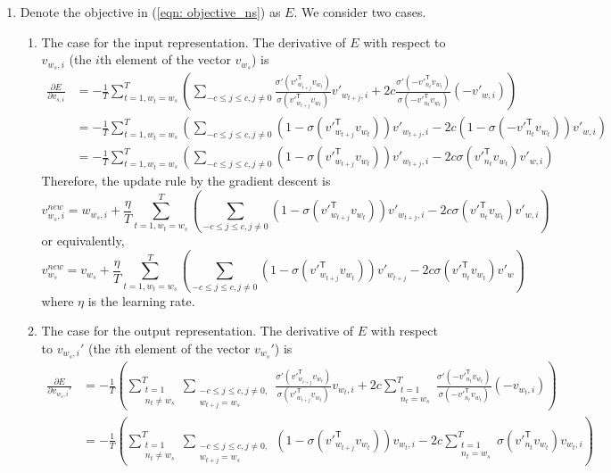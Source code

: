 \documentclass[
	12pt, %
]{../Template/fphw}
\newcommand{\T}{\mathsf{T}}
\begin{document}
\begin{enumerate}[label=(\arabic*)]
    \item Denote the objective in (\ref{eqn: objective_ns}) as $E$. We consider two cases.
        \begin{enumerate}[label=(\roman*)]
            \item The case for the input representation. The derivative of $E$ with respect to $v_{w_s,i}$ (the $i$th element of the vector $v_{w_s}$) is
            \begin{align}
                \frac{\partial E}{\partial v_{s,i}} &= -\frac{1}{T}\sum_{t=1, w_t=w_s}^{T}\left(\sum_{-c\leq j \leq c, j\neq 0}  \frac{\sigma'(v'^\T_{w_{t+j}} v_{w_t})}{\sigma(v'^\T_{w_{t+j}} v_{w_t})}v'_{w_{t+j},i}+2c\frac{\sigma'(-v'^\T_{n_t} v_{w_t})}{\sigma(-v'^\T_{n_t} v_{w_t})}(-v'_{w,i}) \right) \\ &= -\frac{1}{T}\sum_{t=1, w_t=w_s}^{T}\left(\sum_{-c\leq j \leq c, j\neq 0}  (1-\sigma(v'^\T_{w_{t+j}} v_{w_t}))v'_{w_{t+j},i}-2c(1-\sigma(-v'^\T_{n_t} v_{w_t}))v'_{w,i} \right) \\ &=-\frac{1}{T}\sum_{t=1, w_t=w_s}^{T}\left(\sum_{-c\leq j \leq c, j\neq 0}  (1-\sigma(v'^\T_{w_{t+j}} v_{w_t}))v'_{w_{t+j},i}-2c\sigma(v'^\T_{n_t} v_{w_t})v'_{w,i} \right)
            \end{align}
            Therefore, the update rule by the gradient descent is
            \begin{equation}
                v_{w_s,i}^{new} = w_{w_s,i}+\frac{\eta}{T}\sum_{t=1, w_t=w_s}^{T}\left(\sum_{-c\leq j \leq c, j\neq 0}  (1-\sigma(v'^\T_{w_{t+j}} v_{w_t}))v'_{w_{t+j},i}-2c\sigma(v'^\T_{n_t} v_{w_t})v'_{w,i} \right)
            \end{equation}
            or equivalently,
            \begin{equation}
                v_{w_s}^{new} = v_{w_s}+\frac{\eta}{T}\sum_{t=1, w_t=w_s}^{T}\left(\sum_{-c\leq j \leq c, j\neq 0}  (1-\sigma(v'^\T_{w_{t+j}} v_{w_t}))v'_{w_{t+j}}-2c\sigma(v'^\T_{n_t} v_{w_t})v'_{w} \right)
            \end{equation}
            where $\eta$ is the learning rate.
            \item The case for the output representation. The derivative of $E$ with respect to $v_{w_s,i}'$ (the $i$th element of the vector $v_{w_s}'$) is
            \begin{align}
                \frac{\partial E}{\partial v_{w_s,i}'} &= -\frac{1}{T}\left(\sum_{\substack{t=1\\n_t \neq w_s}}^{T}\sum_{\substack{-c\leq j \leq c, j\neq 0, \\ w_{t+j}=w_s}}\frac{\sigma'(v'^\T_{w_{t+j}} v_{w_t})}{\sigma(v'^\T_{w_{t+j}}v_{w_t})} v_{w_t,i}+2c\sum_{\substack{t=1\\n_t = w_s}}^T\frac{\sigma'(-v'^\T_{n_t} v_{w_t})}{\sigma(-v'^\T_{n_t} v_{w_t})}(-v_{w_t,i}) \right) \\ &=-\frac{1}{T}\left(\sum_{\substack{t=1\\n_t \neq w_s}}^{T}\sum_{\substack{-c\leq j \leq c, j\neq 0, \\ w_{t+j}=w_s}}(1-\sigma(v'^\T_{w_{t+j}} v_{w_t})) v_{w_t,i}-2c\sum_{\substack{t=1\\n_t = w_s}}^T\sigma(v'^\T_{n_t} v_{w_t})v_{w_t,i} \right)

\end{align}
\end{enumerate}
\end{enumerate}
\end{document}

